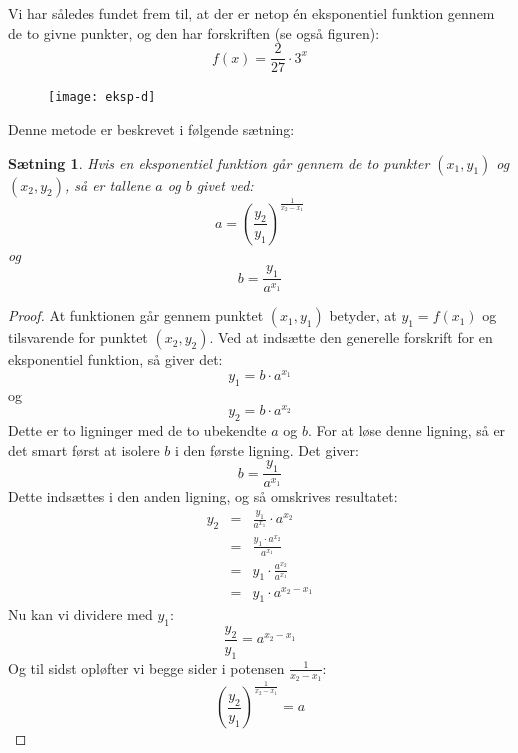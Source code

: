 \documentclass[12pt,oneside,a4paper]{article}
\newcommand{\bas}{\begin{eqnarray*}}
\newcommand{\eas}{\end{eqnarray*}}
\newtheorem{thm}{Sætning}[section]
\begin{document}
Vi har således fundet frem til, at der er netop én eksponentiel funktion gennem de to givne punkter, og 
den har forskriften (se også figuren):
$$
f(x) = \frac{2}{27} \cdot 3^x
$$

\begin{figure}[ht]
    \centering
    \texttt{[image: eksp-d]}
    \label{eksp-d}
\end{figure}

Denne metode er beskrevet i følgende sætning:

\begin{thm}
    Hvis en eksponentiel funktion går gennem de to punkter $(x_1, y_1)$ og $(x_2, y_2)$,
    så er tallene $a$ og $b$ givet ved:
    $$
    a = \left(\frac{y_2}{y_1}\right)^{\frac{1}{x_2-x_1}}
    $$
    og
    $$
    b = \frac{y_1}{a^{x_1}}
    $$
\end{thm}
\begin{proof}
    At funktionen går gennem punktet $(x_1, y_1)$ betyder, at $y_1 = f(x_1)$ og tilsvarende for punktet
    $(x_2,y_2)$. Ved at indsætte den generelle forskrift for en eksponentiel funktion, så giver det:
    $$
    y_1 = b\cdot a^{x_1}
    $$
    og 
    $$
    y_2 = b \cdot a^{x_2}
    $$
    Dette er to ligninger med de to ubekendte $a$ og $b$. For at løse denne ligning, så er det smart først
    at isolere $b$ i den første ligning. Det giver:
    $$
    b = \frac{y_1}{a^{x_1}}
    $$
    Dette indsættes i den anden ligning, og så omskrives resultatet:
    \bas
    y_2 &=& \frac{y_1}{a^{x_1}} \cdot a^{x_2} \\
    &=& \frac{y_1 \cdot a^{x_2}}{a^{x_1}} \\
    &=& y_1 \cdot \frac{a^{x_2}}{a^{x_1}} \\
    &=& y_1 \cdot a^{x_2-x_1}
    \eas
    Nu kan vi dividere med $y_1$:
    $$
    \frac{y_2}{y_1} = a^{x_2-x_1}
    $$
    Og til sidst opløfter vi begge sider i potensen $\frac{1}{x_2-x_1}$:
    $$
    \left(\frac{y_2}{y_1}\right)^{\frac{1}{x_2-x_1}} = a
    $$
\end{proof}
\end{document}
